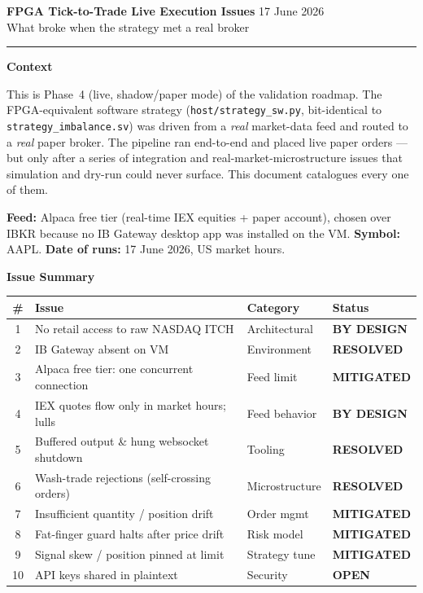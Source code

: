 \documentclass[10pt,a4paper]{article}
\newcommand{\fixed}{\textcolor{okgreen}{\textbf{RESOLVED}}}
\newcommand{\mitig}{\textcolor{warnamber}{\textbf{MITIGATED}}}
\newcommand{\openi}{\textcolor{badred}{\textbf{OPEN}}}
\newcommand{\bydesign}{\textcolor{accentteal}{\textbf{BY DESIGN}}}
\begin{document}
{\LARGE\bfseries\color{hdrblue} FPGA Tick-to-Trade \textendash{} Live Execution Issues}%
\hfill{\small\color{rulegray} 17 June 2026}\\[-2pt]
{\large\color{accentteal} What broke when the strategy met a real broker}

\textcolor{hdrblue}{\rule{\linewidth}{2pt}}

\begin{keybox}
{\large\bfseries\color{newtext} Context}

\smallskip
This is Phase~4 (live, shadow/paper mode) of the validation roadmap. The
FPGA-equivalent software strategy (\texttt{host/strategy\_sw.py}, bit-identical
to \texttt{strategy\_imbalance.sv}) was driven from a \emph{real} market-data
feed and routed to a \emph{real} paper broker. The pipeline ran end-to-end and
placed live paper orders --- but only after a series of integration and
real-market-microstructure issues that simulation and dry-run could never
surface. This document catalogues every one of them.

\smallskip
\textbf{Feed:} Alpaca free tier (real-time IEX equities + paper account),
chosen over IBKR because no IB Gateway desktop app was installed on the VM.
\textbf{Symbol:} AAPL. \textbf{Date of runs:} 17 June 2026, US market hours.
\end{keybox}

{\large\bfseries\color{hdrblue} Issue Summary}
\vspace{4pt}

\begin{center}
\renewcommand{\arraystretch}{1.3}
\begin{tabularx}{\linewidth}{@{}c>{\raggedright\arraybackslash}X l l@{}}
\toprule
\textbf{\#} & \textbf{Issue} & \textbf{Category} & \textbf{Status} \\
\midrule
1 & No retail access to raw NASDAQ ITCH         & Architectural & \bydesign \\
2 & IB Gateway absent on VM                      & Environment   & \fixed   \\
3 & Alpaca free tier: one concurrent connection  & Feed limit    & \mitig   \\
4 & IEX quotes flow only in market hours; lulls  & Feed behavior & \bydesign\\
5 & Buffered output \& hung websocket shutdown   & Tooling       & \fixed   \\
6 & Wash-trade rejections (self-crossing orders) & Microstructure& \fixed   \\
7 & Insufficient quantity / position drift       & Order mgmt    & \mitig   \\
8 & Fat-finger guard halts after price drift     & Risk model    & \mitig   \\
9 & Signal skew / position pinned at limit       & Strategy tune & \mitig   \\
10& API keys shared in plaintext                 & Security      & \openi   \\
\bottomrule
\end{tabularx}
\end{center}
\end{document}
